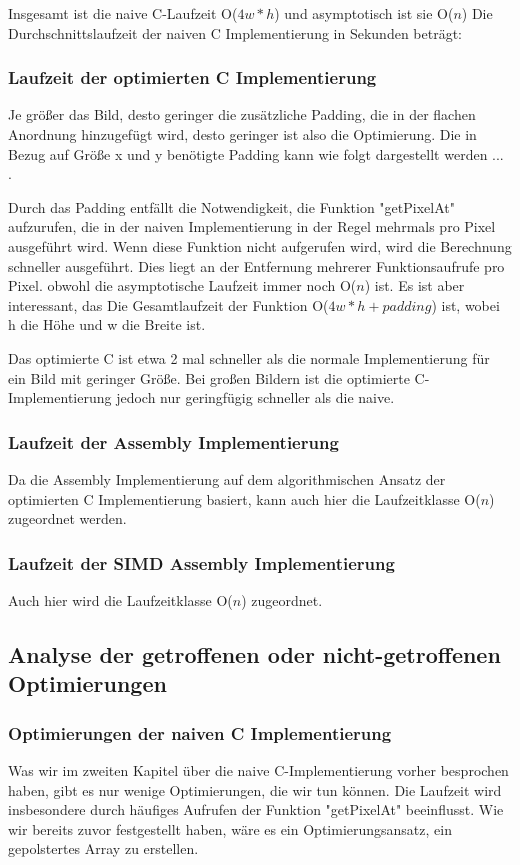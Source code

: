 \documentclass[course=asp]{aspdoc}
\begin{document}
Insgesamt ist die naive C-Laufzeit O($4w*h$) und asymptotisch ist sie O($n$)
Die Durchschnittslaufzeit der naiven C Implementierung in Sekunden beträgt: 

\subsubsection{Laufzeit der optimierten C Implementierung}
Je größer das Bild, desto geringer die zusätzliche Padding, die in der flachen Anordnung hinzugefügt wird, desto geringer ist also die Optimierung. Die in Bezug auf Größe x und y benötigte Padding kann wie folgt dargestellt werden ... .

Durch das Padding entfällt die Notwendigkeit, die Funktion "getPixelAt" aufzurufen, die in der naiven Implementierung in der Regel mehrmals pro Pixel ausgeführt wird. Wenn diese Funktion nicht aufgerufen wird, wird die Berechnung schneller ausgeführt. Dies liegt an der Entfernung mehrerer Funktionsaufrufe pro Pixel. obwohl die asymptotische Laufzeit immer noch O($n$) ist. Es ist aber interessant, das Die Gesamtlaufzeit der Funktion O($4w*h + padding$) ist, wobei h die Höhe und w die Breite ist.

Das optimierte C ist etwa 2 mal schneller als die normale Implementierung für ein Bild mit geringer Größe. Bei großen Bildern ist die optimierte C-Implementierung jedoch nur geringfügig schneller als die naive.

\subsubsection{Laufzeit der Assembly Implementierung}
Da die Assembly Implementierung auf dem algorithmischen Ansatz der optimierten C Implementierung basiert, kann auch hier die Laufzeitklasse O($n$) zugeordnet werden.

\subsubsection{Laufzeit der SIMD Assembly Implementierung}
Auch hier wird die Laufzeitklasse O($n$) zugeordnet.

\subsection{Analyse der getroffenen oder nicht-getroffenen Optimierungen}

\subsubsection{Optimierungen der naiven C Implementierung}
Was wir im zweiten Kapitel über die naive C-Implementierung vorher besprochen haben, gibt es nur wenige Optimierungen, die wir tun können. Die Laufzeit wird insbesondere durch häufiges Aufrufen der Funktion "getPixelAt" beeinflusst. Wie wir bereits zuvor festgestellt haben, wäre es ein Optimierungsansatz, ein gepolstertes Array zu erstellen.
\end{document}
